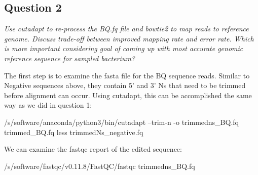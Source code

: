 \documentclass[]{article}
\newenvironment{Shaded}{\begin{snugshade}}{\end{snugshade}}
\newcommand{\FunctionTok}[1]{\textcolor[rgb]{0.00,0.00,0.00}{#1}}
\newcommand{\ExtensionTok}[1]{#1}
\newcommand{\NormalTok}[1]{#1}
\begin{document}
\subsection{Question 2}\label{question-2}

\emph{Use cutadapt to re-process the BQ.fq file and bowtie2 to map reads
to reference genome. Discuss trade-off between improved mapping rate and
error rate. Which is more important considering goal of coming up with
most accurate genomic reference sequence for sampled bacterium?}

The first step is to examine the fasta file for the BQ sequence reads.
Similar to Negative sequences above, they contain 5' and 3' Ns that need
to be trimmed before alignment can occur. Using cutadapt, this can be
accomplished the same way as we did in question 1:

\begin{Shaded}
\begin{Highlighting}[]
\ExtensionTok{/s/software/anaconda/python3/bin/cutadapt}\NormalTok{ --trim-n -o trimmedns_BQ.fq trimmed_BQ.fq}
\FunctionTok{less}\NormalTok{ trimmedNs_negative.fq}
\end{Highlighting}
\end{Shaded}

We can examine the fastqc report of the edited sequence:

\begin{Shaded}
\begin{Highlighting}[]
\ExtensionTok{/s/software/fastqc/v0.11.8/FastQC/fastqc}\NormalTok{ trimmedns_BQ.fq}
\end{Highlighting}
\end{Shaded}
\end{document}
